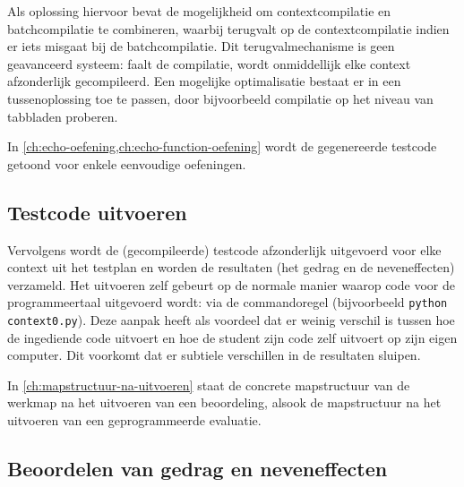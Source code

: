 Als oplossing hiervoor bevat \tested{} de mogelijkheid om contextcompilatie en batchcompilatie te combineren, waarbij \tested{} terugvalt op de contextcompilatie indien er iets misgaat bij de batchcompilatie.
Dit terugvalmechanisme is geen geavanceerd systeem: faalt de compilatie, wordt onmiddellijk elke context afzonderlijk gecompileerd.
Een mogelijke optimalisatie bestaat er in een tussenoplossing toe te passen, door bijvoorbeeld compilatie op het niveau van tabbladen proberen.

In \cref{ch:echo-oefening,ch:echo-function-oefening} wordt de gegenereerde testcode getoond voor enkele eenvoudige oefeningen.

\subsection{Testcode uitvoeren}\label{subsec:testcode-uitvoeren}

Vervolgens wordt de (gecompileerde) testcode afzonderlijk uitgevoerd voor elke context uit het testplan en worden de resultaten (het gedrag en de neveneffecten) verzameld.
Het uitvoeren zelf gebeurt op de normale manier waarop code voor de programmeertaal uitgevoerd wordt: via de commandoregel (bijvoorbeeld \texttt{python context0.py}).
Deze aanpak heeft als voordeel dat er weinig verschil is tussen hoe \tested{} de ingediende code uitvoert en hoe de student zijn code zelf uitvoert op zijn eigen computer.
Dit voorkomt dat er subtiele verschillen in de resultaten sluipen.

In \cref{ch:mapstructuur-na-uitvoeren} staat de concrete mapstructuur van de werkmap na het uitvoeren van een beoordeling, alsook de mapstructuur na het uitvoeren van een geprogrammeerde evaluatie.

\subsection{Beoordelen van gedrag en neveneffecten}\label{subsec:beoordelen-van-gedrag}

